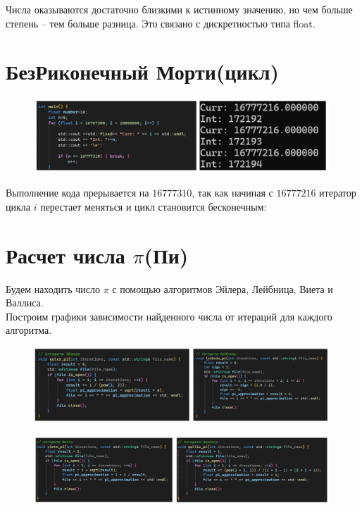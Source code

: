 \documentclass[a4paper,12pt]{article} %
\begin{document}
Числа оказываются достаточно близкими к истинному значению, но чем больше степень -- тем больше разница. Это связано с дискретностью типа float.

\section{БезРиконечный Морти(цикл)}
\begin{figure}[H]
    \centering
    \includegraphics[width=0.99\textwidth]{3.jpg}
\end{figure} 
Выполнение кода прерывается на $16777310$, так как начиная с $16777216$ итератор цикла $i$ перестает меняться и цикл становится бесконечным:

\section{Расчет числа $\pi$(Пи)}
Будем находить число $\pi$ с помощью алгоритмов Эйлера, Лейбница, Виета и Валлиса.\\
Построим графики зависимости найденного числа от итераций для каждого алгоритма.\\
\begin{figure}[H]
    \centering
    \includegraphics[width=0.99\textwidth]{4.jpg}
\end{figure} 
\begin{figure}[H]
    \centering
    \includegraphics[width=0.99\textwidth]{5.jpg}
\end{figure} 
\end{document}

